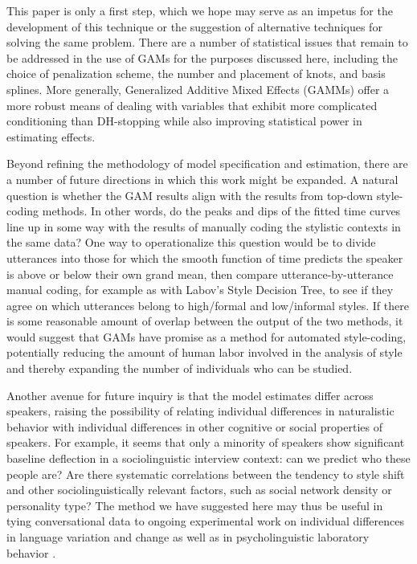 \documentclass[12pt]{article}
\begin{document}
This paper is only a first step, which we hope may serve as an impetus for the development of this technique or the suggestion of alternative techniques for solving the same problem. 
There are a number of statistical issues that remain to be addressed in the use of GAMs for the purposes discussed here, including the choice of penalization scheme, the number and placement of knots, and basis splines. More generally, Generalized Additive Mixed Effects (GAMMs) offer a more robust means of dealing with variables that exhibit more complicated conditioning than DH-stopping while also improving statistical power in estimating effects.


Beyond refining the methodology of model specification and estimation, there are a number of future directions in which this work might be expanded. A natural question is whether the GAM results align with the results from top-down style-coding methods. In other words, do the peaks and dips of the fitted time curves line up in some way with the results of  manually coding the stylistic contexts in the same data? One way to operationalize this question would be to divide utterances into those for which the smooth function of time predicts the speaker is above or below their own grand mean, then compare utterance-by-utterance manual coding, for example as with Labov's \citeyearpar{Labov:2001} Style Decision Tree, to see if they agree on which utterances belong to high/formal and low/informal styles. If there is some reasonable amount of overlap between the output of the two methods, it would suggest that GAMs have promise as a method for automated style-coding, potentially reducing the amount of human labor involved in the analysis of style and thereby expanding the number of individuals who can be studied. 

Another avenue for future inquiry is that the model estimates differ across speakers, raising the possibility of relating individual differences in naturalistic behavior with individual differences in other cognitive or social properties of speakers. For example, it seems that only a minority of speakers show  significant baseline deflection in a sociolinguistic interview context: can we predict who these people are? Are there systematic correlations between the tendency to style shift and other sociolinguistically relevant factors, such as social network density or personality type? The method we have suggested here may thus be useful in tying conversational data to ongoing experimental work on individual differences in language variation and change \citep[inter alia]{Campbell-Kibler:2008,Baker:2011,Yu:2013,Forrest:2015} as well as in psycholinguistic laboratory behavior \citep[inter alia]{Stewart:2008,Dimov:2012,Lev-Ari:2014,Jun:2015}.
\end{document}
